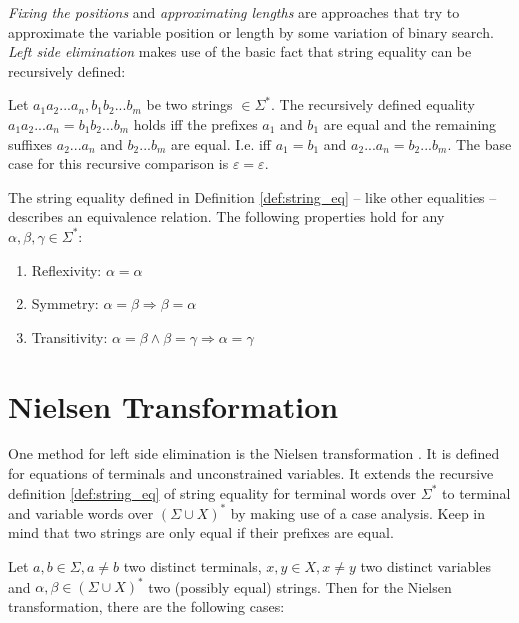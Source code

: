 \textit{Fixing the positions} and \textit{approximating lengths} are approaches that try to approximate the variable position or length by some variation of binary search.
\textit{Left side elimination} makes use of the basic fact that string equality can be recursively defined:

\begin{definition} \label{def:string_eq}
  Let $a_1a_2...a_n, b_1b_2...b_m $ be two strings $\in \Sigma^*$.
  The recursively defined equality $a_1a_2...a_n = b_1b_2...b_m$ holds iff the prefixes $a_1$ and $b_1$ are equal and the remaining suffixes $a_2...a_n$ and $b_2...b_m$ are equal. I.e. iff $a_1 = b_1$ and $a_2...a_n = b_2...b_m$. The base case for this recursive comparison is $\varepsilon = \varepsilon$.
\end{definition}

\begin{theorem}
  The string equality defined in Definition \ref{def:string_eq} -- like other equalities -- describes an equivalence relation. The following properties hold for any $\alpha, \beta, \gamma \in \Sigma^*$:
  
  \begin{enumerate}
      \item Reflexivity: $\alpha = \alpha$
      \item Symmetry: $\alpha = \beta \Rightarrow \beta = \alpha$
      \item Transitivity: $\alpha = \beta \land \beta = \gamma \Rightarrow \alpha = \gamma$
  \end{enumerate}
\end{theorem}

\section{Nielsen Transformation}
One method for left side elimination is the Nielsen transformation \cite{nielsen1917}. It is defined for equations of terminals and unconstrained variables. It extends the recursive definition \ref{def:string_eq} of string equality for terminal words over $\Sigma^*$ to terminal and variable words over $(\Sigma \cup X)^*$ by making use of a case analysis. Keep in mind that two strings are only equal if their prefixes are equal.

Let $a, b \in \Sigma, a \neq b$ two distinct terminals, $x, y \in X, x \neq y$ two distinct variables and $\alpha, \beta \in (\Sigma \cup X)^*$ two (possibly equal) strings. Then for the Nielsen transformation, there are the following cases:


